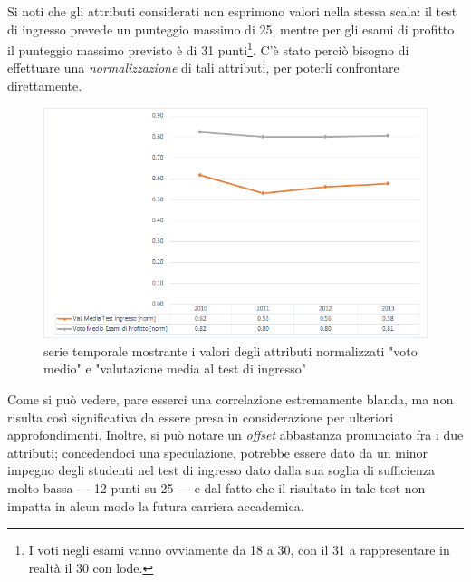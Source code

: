     Si noti che gli attributi considerati non esprimono valori nella stessa scala: il test di ingresso prevede un punteggio massimo di 25, mentre per gli esami di profitto il punteggio massimo previsto è di 31 punti\footnote{I voti negli esami vanno ovviamente da 18 a 30, con il 31 a rappresentare in realtà il 30 con lode.}. C'è stato perciò bisogno di effettuare una \textit{normalizzazione} di tali attributi, per poterli confrontare direttamente. \\

    \begin{figure}
        \centering
        \caption{serie temporale mostrante i valori degli attributi normalizzati "voto medio" e "valutazione media al test di ingresso"}
        \label{test}
        \includegraphics[scale=0.55]{../visual/stud_2.png}
    \end{figure}

    Come si può vedere, pare esserci una correlazione estremamente blanda, ma non risulta così significativa da essere presa in considerazione per ulteriori approfondimenti. Inoltre, si può notare un \textit{offset} abbastanza pronunciato fra i due attributi; concedendoci una speculazione, potrebbe essere dato da un minor impegno degli studenti nel test di ingresso dato dalla sua soglia di sufficienza molto bassa --- 12 punti su 25 --- e dal fatto che il risultato in tale test non impatta in alcun modo la futura carriera accademica. \\

